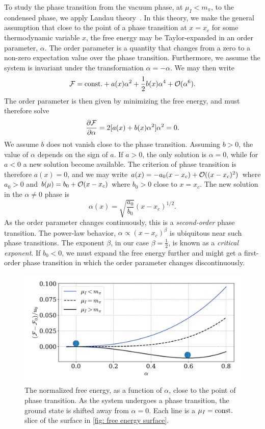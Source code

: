To study the phase transition from the vacuum phase, at $\mu_I < m_{\pi}$, to the condensed phase, we apply Landau theory~\autocite{peskinIntroductionQuantumField1995}.
In this theory, we make the general assumption that close to the point of a phase transition at $x = x_c$ for some thermodynamic variable $x$, the free energy may be Taylor-expanded in an order parameter, $\alpha$.
The order parameter is a quantity that changes from a zero to a non-zero expectation value over the phase transition.
Furthermore, we assume the system is invariant under the transformation $\alpha = -\alpha$.
We may then write
%
\begin{equation}
    \mathcal{F} = \mathrm{const.} + a(x)\alpha^2 + \frac{1}{2} b(x)\alpha^4 + \mathcal O(\alpha^6).
\end{equation}
%
The order parameter is then given by minimizing the free energy, and must therefore solve
%
\begin{equation}
    \pdv{\mathcal{F}}{\alpha} = 2[a(x) + b(x) \alpha^2]\alpha^2 = 0.
\end{equation}
%
We assume $b$ does not vanish close to the phase transition.
Assuming $b > 0$, the value of $\alpha$ depends on the sign of $a$.
If $a>0$, the only solution is $\alpha = 0$, while for $a<0$ a new solution become available.
The criterion of phase transition is therefore $a(x) = 0$, and we may write $a(x) = -a_0(x - x_c) + \mathcal O((x - x_c)^2)$ where $a_0 > 0$ and $b(\mu) = b_0 + \mathcal O(x - x_c)$ where $b_0>0$ close to $x = x_c$. 
The new solution in the $\alpha \neq 0$ phase is
%
\begin{equation}
    \alpha(x) = \sqrt{\frac{a_0}{b_0}}(x - x_c)^{1/2}.
\end{equation}
%
As the order parameter changes continuously, this is a \emph{second-order} phase transition.
The power-law behavior, $\alpha \propto (x - x_c)^\beta$ is ubiquitous near such phase transitions.
The exponent $\beta$, in our case $\beta = \frac{1}{2}$, is known as a \emph{critical exponent}.
If $b_0<0$, we must expand the free energy further and might get a first-order phase transition in which the order parameter changes discontinuously.

\begin{figure}[!htb]
    \centering
    \includegraphics[width=.8\textwidth]{../scripts/figurer/phase_transition.pdf}
    \caption{
        The normalized free energy, as a function of $\alpha$, close to the point of phase transition. 
        As the system undergoes a phase transition, the ground state is shifted away from $\alpha = 0$.
        Each line is a $\mu_I=\mathrm{const.}$ slice of the surface in \autoref{fig: free energy surface}.
        }
    \label{fig: phase transition}
\end{figure}

